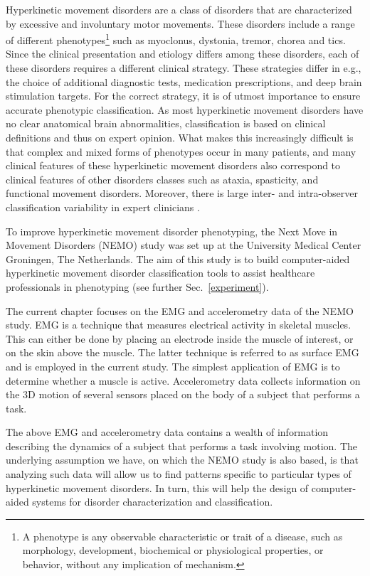 Hyperkinetic movement disorders are a class of disorders that are characterized by excessive and involuntary motor movements. These disorders include a range of different phenotypes\footnote{A phenotype is any observable characteristic or trait of a disease, such as morphology, development, biochemical or physiological properties, or behavior, without any implication of mechanism.} such as myoclonus, dystonia, tremor, chorea and tics. Since the clinical presentation and etiology differs among these disorders, each of these disorders requires a different clinical strategy. These strategies differ in e.g., the choice of additional diagnostic tests, medication prescriptions, and deep brain stimulation targets. For the correct strategy, it is of utmost importance to ensure accurate phenotypic classification. As most hyperkinetic movement disorders have no clear anatomical brain abnormalities, classification is based on clinical definitions and thus on expert opinion. What makes this increasingly difficult is that complex and mixed forms of phenotypes occur in many patients, and many clinical features of these hyperkinetic movement disorders also correspond to clinical features of other disorders classes such as ataxia, spasticity, and functional movement disorders. Moreover, there is large inter- and intra-observer classification variability in expert clinicians \citep{VANDERVEEN2021176,defazio,eggink,beghi,vandersalm}.

To improve hyperkinetic movement disorder phenotyping, the Next Move in Movement Disorders (NEMO) \citep{NEMO} study was set up at the University Medical Center Groningen, The Netherlands. The aim of this study is to build computer-aided hyperkinetic movement disorder classification tools to assist healthcare professionals in phenotyping (see further Sec.~\ref{experiment}). 

The current chapter focuses on the EMG and accelerometry data of the NEMO study. EMG is a technique that measures electrical activity in skeletal muscles. This can either be done by placing an electrode inside the muscle of interest, or on the skin above the muscle. The latter technique is referred to as surface EMG and is employed in the current study. The simplest application of EMG is to determine whether a muscle is active. Accelerometry data collects information on the 3D motion of several sensors placed on the body of a subject that performs a task.

The above EMG and accelerometry data contains a wealth of information describing the dynamics of a subject that performs a task involving motion. The underlying assumption we have, on which the NEMO study is also based, is that analyzing such data will allow us to find patterns specific to particular types of hyperkinetic movement disorders. In turn, this will help the design of computer-aided systems for disorder characterization and classification.

